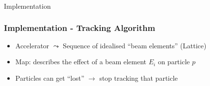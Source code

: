 \documentclass{beamer}
\begin{document}
\begin{frame}
    \begin{center}
    {\HUGE{}Implementation}
    \end{center}
\end{frame}

\begin{frame}[t]
\frametitle{Implementation - Tracking Algorithm}
\begin{itemize}
 \item Accelerator $\leadsto$ Sequence of idealised ``beam elements'' ({\color{MyDarkBlue}}Lattice)
 \item Map: describes the effect of a beam element $E_i$ on particle $p$
 \item Particles can get ``lost'' $\rightarrow$ stop tracking that particle
\end{itemize}


\end{frame}
\end{document}
